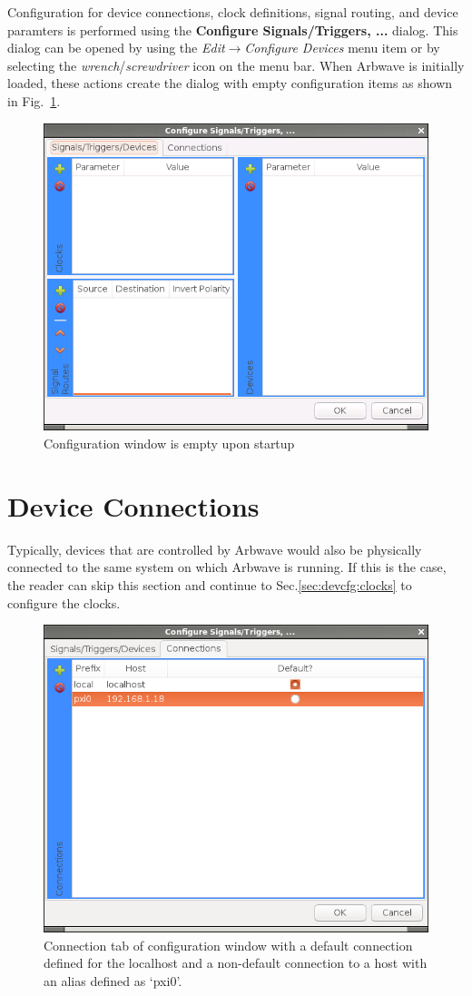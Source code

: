 \thispagestyle{fancy}
\pagestyle{fancy}

Configuration for device connections, clock definitions, signal routing, and
device paramters is performed using the \textbf{Configure Signals/Triggers, ...}
dialog.  This dialog can be opened by using the
\textit{Edit$\rightarrow$Configure Devices} menu item or by selecting the
\textit{wrench}/\textit{screwdriver} icon on the menu bar.  When Arbwave is
initially loaded, these actions create the dialog with empty configuration items
as shown in Fig.~\ref{fig:devcfg:empty}.

\begin{figure}[h!]
  \centerline{\includegraphics[width=.46\textwidth]{figures/empty}}
  \caption{Configuration window is empty upon startup}
  \label{fig:devcfg:empty}
\end{figure}


\section{Device Connections}\label{sec:devcfg:conn}
Typically, devices that are controlled by Arbwave would also be physically
connected to the same system on which Arbwave is running.  If this is the case,
the reader can skip this section and continue to Sec.\ref{sec:devcfg:clocks} to
configure the clocks.


\begin{figure}[h!]
  \centerline{\includegraphics[width=.46\textwidth]{figures/connections}}
  \caption{Connection tab of configuration window with a default connection defined for
  the localhost and a non-default connection to a host with an alias defined as
  `pxi0'.}
  \label{fig:devcfg:connection}
\end{figure}

